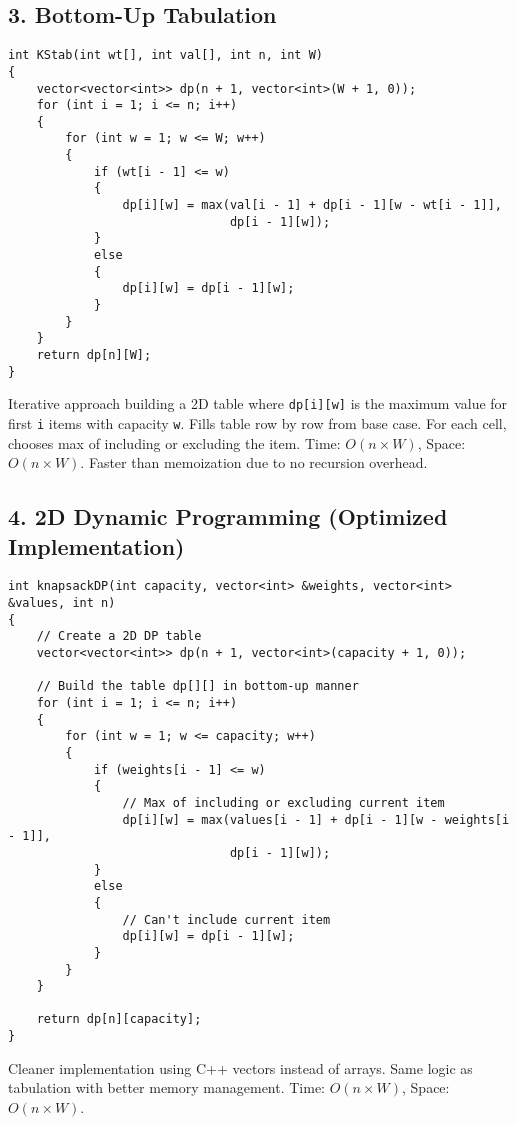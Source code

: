 \documentclass[12pt]{article}
\begin{document}
\newpage
\subsection*{3. Bottom-Up Tabulation}

\begin{lstlisting}
int KStab(int wt[], int val[], int n, int W)
{
    vector<vector<int>> dp(n + 1, vector<int>(W + 1, 0));
    for (int i = 1; i <= n; i++)
    {
        for (int w = 1; w <= W; w++)
        {
            if (wt[i - 1] <= w)
            {
                dp[i][w] = max(val[i - 1] + dp[i - 1][w - wt[i - 1]], 
                               dp[i - 1][w]);
            }
            else
            {
                dp[i][w] = dp[i - 1][w];
            }
        }
    }
    return dp[n][W];
}
\end{lstlisting}

Iterative approach building a 2D table where \texttt{dp[i][w]} is the maximum value for first \texttt{i} items with capacity \texttt{w}. Fills table row by row from base case. For each cell, chooses max of including or excluding the item. Time: $O(n \times W)$, Space: $O(n \times W)$. Faster than memoization due to no recursion overhead.

\newpage
\subsection*{4. 2D Dynamic Programming (Optimized Implementation)}

\begin{lstlisting}
int knapsackDP(int capacity, vector<int> &weights, vector<int> &values, int n)
{
    // Create a 2D DP table
    vector<vector<int>> dp(n + 1, vector<int>(capacity + 1, 0));

    // Build the table dp[][] in bottom-up manner
    for (int i = 1; i <= n; i++)
    {
        for (int w = 1; w <= capacity; w++)
        {
            if (weights[i - 1] <= w)
            {
                // Max of including or excluding current item
                dp[i][w] = max(values[i - 1] + dp[i - 1][w - weights[i - 1]], 
                               dp[i - 1][w]);
            }
            else
            {
                // Can't include current item
                dp[i][w] = dp[i - 1][w];
            }
        }
    }

    return dp[n][capacity];
}
\end{lstlisting}

Cleaner implementation using C++ vectors instead of arrays. Same logic as tabulation with better memory management. Time: $O(n \times W)$, Space: $O(n \times W)$.
\end{document}
